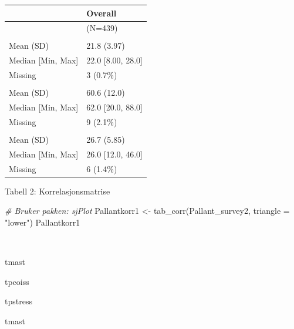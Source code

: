 \documentclass[
]{article}
\newenvironment{Shaded}{\begin{snugshade}}{\end{snugshade}}
\newcommand{\AttributeTok}[1]{\textcolor[rgb]{0.77,0.63,0.00}{#1}}
\newcommand{\CommentTok}[1]{\textcolor[rgb]{0.56,0.35,0.01}{\textit{#1}}}
\newcommand{\FunctionTok}[1]{\textcolor[rgb]{0.00,0.00,0.00}{#1}}
\newcommand{\NormalTok}[1]{#1}
\newcommand{\OtherTok}[1]{\textcolor[rgb]{0.56,0.35,0.01}{#1}}
\newcommand{\StringTok}[1]{\textcolor[rgb]{0.31,0.60,0.02}{#1}}
\begin{document}
\begin{tabular}[t]{ll}
\toprule
  & Overall\\
\midrule
 & (N=439)\\
\addlinespace[0.3em]
\multicolumn{2}{l}{\textbf{tmast}}\\
\hspace{1em}Mean (SD) & 21.8 (3.97)\\
\hspace{1em}Median [Min, Max] & 22.0 [8.00, 28.0]\\
\hspace{1em}Missing & 3 (0.7\%)\\
\addlinespace[0.3em]
\multicolumn{2}{l}{\textbf{tpcoiss}}\\
\hspace{1em}Mean (SD) & 60.6 (12.0)\\
\hspace{1em}Median [Min, Max] & 62.0 [20.0, 88.0]\\
\hspace{1em}Missing & 9 (2.1\%)\\
\addlinespace[0.3em]
\multicolumn{2}{l}{\textbf{tpstress}}\\
\hspace{1em}Mean (SD) & 26.7 (5.85)\\
\hspace{1em}Median [Min, Max] & 26.0 [12.0, 46.0]\\
\hspace{1em}Missing & 6 (1.4\%)\\
\bottomrule
\end{tabular}

Tabell 2: Korrelasjonsmatrise

\begin{Shaded}
\begin{Highlighting}[]
\CommentTok{\# Bruker pakken: sjPlot}
\NormalTok{Pallantkorr1 }\OtherTok{\textless{}{-}} \FunctionTok{tab\_corr}\NormalTok{(Pallant\_survey2, }\AttributeTok{triangle =} \StringTok{"lower"}\NormalTok{)}
\NormalTok{Pallantkorr1}
\end{Highlighting}
\end{Shaded}

~

tmast

tpcoiss

tpstress

tmast

~

~

~
\end{document}
